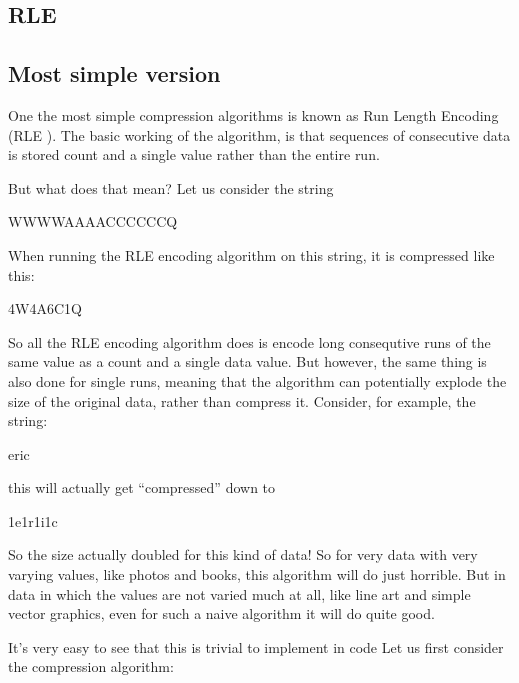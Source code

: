 \begin{refsection}
\section{RLE}
\label{sec:rle}

\subsection{Most simple version}
\label{sec:most-simple-version}

One the most simple compression algorithms is known as Run Length
Encoding (RLE
). \cite{nagarajan11:_enhan_approac_run_lengt_encod_schem}
The basic working of the algorithm, is that sequences of consecutive
data is stored count and a single value rather than the entire
run.

But what does that mean? Let us consider the string

\begin{indentpar}
  WWWWAAAACCCCCCQ
\end{indentpar}

When running the RLE encoding algorithm on this string, it is
compressed like this:

\begin{indentpar}
  4W4A6C1Q
\end{indentpar}

So all the RLE encoding algorithm does is encode long consequtive runs
of the same value as a count and a single data value. But however, the
same thing is also done for single runs, meaning that the algorithm
can potentially explode the size of the original data, rather than
compress it. Consider, for example, the string:

\begin{indentpar}
  eric
\end{indentpar}

this will actually get ``compressed'' down to

\begin{indentpar}
  1e1r1i1c
\end{indentpar}

So the size actually doubled for this kind of data! So for very data
with very varying values, like photos and books, this algorithm will
do just horrible. But in data in which the values are not varied much
at all, like line art and simple vector graphics, even for such a
naive algorithm it will do quite good.

It's very easy to see that this is trivial to implement in code Let us
first consider the compression algorithm:


\end{refsection}
